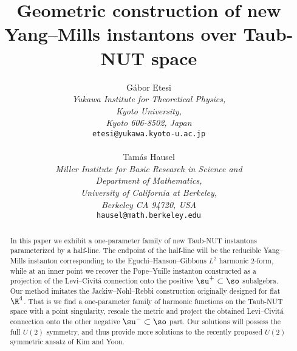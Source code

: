 \documentclass[a4paper,12pt,draft]{article}
\begin{document}
 

\title{Geometric construction of new Yang--Mills instantons over Taub-NUT 
space} 

\author{
G\'abor Etesi
\\ {\it Yukawa Institute for Theoretical Physics,}
\\ {\it  Kyoto University,}
\\{\it Kyoto 606-8502, Japan}
\\ {\tt etesi@yukawa.kyoto-u.ac.jp}
\\
\\ Tam\'as Hausel
\\ {\it Miller Institute for Basic Research in Science and}\\
{\it Department of Mathematics,}
\\ {\it University of California at Berkeley,}
\\ {\it Berkeley CA 94720, USA}\\
{\tt hausel@math.berkeley.edu} }

\maketitle

\pagestyle{myheadings}

\thispagestyle{empty}

\begin{abstract}
In this paper we exhibit a one-parameter family of new Taub-NUT instantons
parameterized by a half-line.  The endpoint of the
half-line will be the reducible Yang--Mills instanton corresponding to the
Eguchi--Hanson--Gibbons $L^2$ harmonic
$2$-form, while at an inner point we recover the Pope--Yuille 
instanton constructed as a projection of the Levi--Civit\'a
connection onto the positive $\su^+\subset \so$ subalgebra. Our method
imitates the Jackiw--Nohl--Rebbi construction originally designed for
flat $\R^4$. That is we find a one-parameter family of harmonic functions
on the Taub-NUT space with a point singularity, rescale the metric and
project the obtained Levi--Civit\'a connection onto the other negative
$\su^-\subset\so$ part. Our solutions will possess the full $U(2)$
symmetry, and thus provide more solutions to the recently proposed $U(2)$
symmetric ansatz of Kim and Yoon. 

\end{abstract}

\newpage
\end{document}

